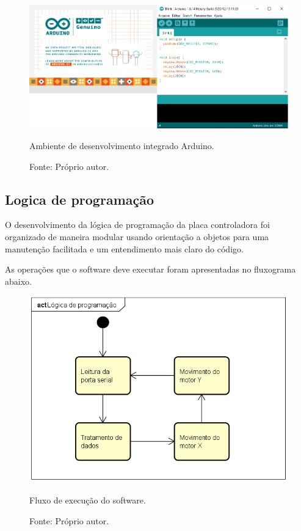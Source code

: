 \begin{figure}[H]
\centering
\includegraphics[width = 1\linewidth]{figuras/idearduino}
\caption{Ambiente de desenvolvimento integrado Arduino.}
\caption*{Fonte: Próprio autor.}
\label{fig:idearduino}
\end{figure}
    
\subsection{Logica de programação}\label{subsec:metlogica}

O desenvolvimento da lógica de programação da placa controladora foi organizado de maneira modular 
usando orientação a objetos para uma manutenção facilitada e um entendimento mais claro do código.

As operações que o software deve executar foram apresentadas no fluxograma abaixo.

\begin{figure}[H]
\centering
\includegraphics[width = 1\linewidth]{figuras/fluxoexecucao}
\caption{Fluxo de execução do software.}
\caption*{Fonte: Próprio autor.}
\label{fig:fluxoexecucao}
\end{figure}
    
